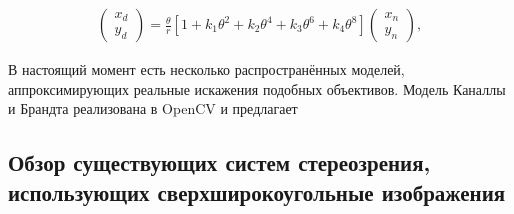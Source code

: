  \begin{equation}	
	\begin{split}
        \begin{pmatrix}x_d\\y_d\end{pmatrix} = \frac{\theta}{r}\left[ 1 + k_1\theta^2 + k_2\theta^4 + k_3\theta^6 + k_4\theta^8\right]\begin{pmatrix}x_n\\y_n\end{pmatrix},
        \label{eqn:fisheye_distortion}
    \end{split}
\end{equation}

В настоящий момент есть несколько распространённых моделей, аппроксимирующих реальные искажения подобных объективов. Модель Каналлы и 
Брандта \cite{opencv_model} реализована в OpenCV и предлагает 


\subsection{Обзор существующих систем стереозрения, использующих сверхширокоугольные изображения}

